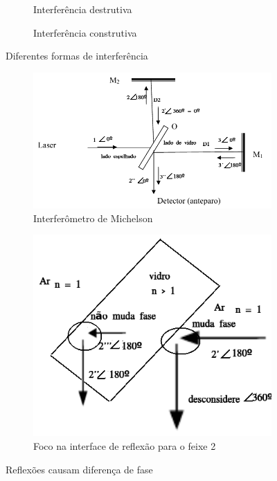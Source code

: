 \documentclass[a4paper,11pt]{article}
\begin{document}
\FloatBarrier
\begin{figure}[H]
	\hspace{-1 cm}
	\begin{subfigure}[!htp]{0.4\textwidth}
			
		\caption{Interferência destrutiva}	
	\end{subfigure}	
		\hspace{3 cm}
	\begin{subfigure}[!htp]{0.5\textwidth}
			
		\caption{Interferência construtiva}
	\end{subfigure}	
	\caption{Diferentes formas de interferência}
	\label{fig:intro-01}
\end{figure} 
\begin{figure}[H]
	\hspace{-1 cm}
	\begin{subfigure}[!htp]{0.5\textwidth}
		\includegraphics[scale=0.5]{./images/interferometro.png}
		\caption{Interferômetro de Michelson}
		\label{fig:intro-02}
	\end{subfigure}
	\hspace{2 cm}
	\begin{subfigure}[!htp]{0.5\textwidth}
		\includegraphics[scale=0.5]{./images/fig-intro03.png}
		\caption{Foco na interface de reflexão para o feixe 2}
		\label{fig:intro-03}
	\end{subfigure}
	\caption{Reflexões causam diferença de fase}
\end{figure}
\FloatBarrier
\end{document}
